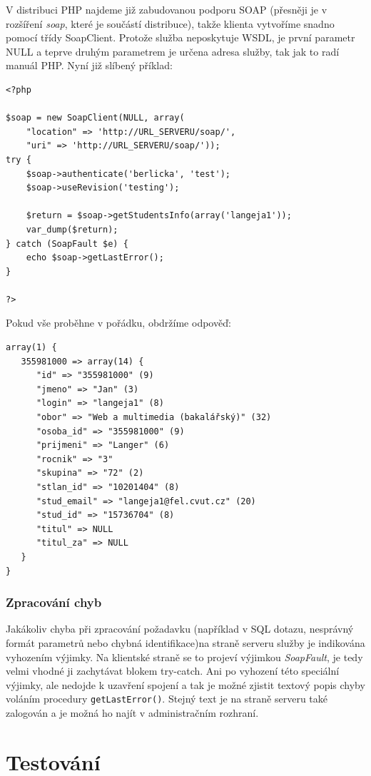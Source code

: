 \documentclass[11pt,twoside,a4paper]{book}
\begin{document}
V distribuci PHP najdeme již zabudovanou podporu SOAP (přesněji je v rozšíření \textit{soap}, které je součástí distribuce), takže klienta vytvoříme snadno pomocí třídy SoapClient. Protože služba neposkytuje WSDL, je první parametr NULL a teprve druhým parametrem je určena adresa služby, tak jak to radí manuál PHP\cite{php:soap}. Nyní již slíbený příklad:
\begin{verbatim}
<?php

$soap = new SoapClient(NULL, array(
    "location" => 'http://URL_SERVERU/soap/',
    "uri" => 'http://URL_SERVERU/soap/'));
try {
    $soap->authenticate('berlicka', 'test');
    $soap->useRevision('testing');

    $return = $soap->getStudentsInfo(array('langeja1'));
    var_dump($return);
} catch (SoapFault $e) {
    echo $soap->getLastError();
}

?>
\end{verbatim}

Pokud vše proběhne v pořádku, obdržíme odpověď:

\begin{verbatim}
array(1) {
   355981000 => array(14) {
      "id" => "355981000" (9)
      "jmeno" => "Jan" (3)
      "login" => "langeja1" (8)
      "obor" => "Web a multimedia (bakalářský)" (32)
      "osoba_id" => "355981000" (9)
      "prijmeni" => "Langer" (6)
      "rocnik" => "3"
      "skupina" => "72" (2)
      "stlan_id" => "10201404" (8)
      "stud_email" => "langeja1@fel.cvut.cz" (20)
      "stud_id" => "15736704" (8)
      "titul" => NULL
      "titul_za" => NULL
   }
}
\end{verbatim}

\subsection{Zpracování chyb}
Jakákoliv chyba při zpracování požadavku (například v SQL dotazu, nesprávný formát parametrů nebo chybná identifikace)na straně serveru služby je indikována vyhozením výjimky. Na klientské straně se to projeví výjimkou \textit{SoapFault}, je tedy velmi vhodné ji zachytávat blokem try-catch. Ani po vyhození této speciální výjimky, ale nedojde k uzavření spojení a tak je možné zjistit textový popis chyby voláním procedury \texttt{getLastError()}. Stejný text je na straně serveru také zalogován a je možná ho najít v administračním rozhraní.


\chapter{Testování}
\end{document}
